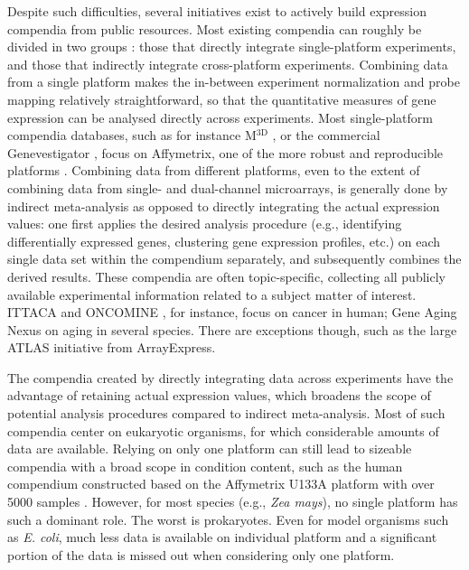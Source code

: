 Despite such difficulties, several initiatives exist to actively build 
expression compendia from public resources. 
Most existing compendia can roughly be divided in two groups \cite{Fierro2008}: 
those that directly integrate single-platform experiments, and those that 
indirectly integrate cross-platform experiments. 
Combining data from a single platform makes the in-between experiment 
normalization and probe mapping relatively straightforward, so that 
the quantitative measures of gene expression can be analysed directly across 
experiments. 
Most single-platform compendia databases, such as for instance 
M$^{\textrm{3D}}$ \cite{Faith2008}, or the commercial Genevestigator 
\cite{Hruz2008}, focus on Affymetrix, one of the more robust and reproducible 
platforms \cite{Bammler2005, Irizarry2005}. 
Combining data from different platforms, even to the extent of combining data 
from single- and dual-channel microarrays, is generally done by indirect 
meta-analysis as opposed to directly integrating the actual expression values: 
one first applies the desired analysis procedure (e.g., identifying 
differentially expressed genes, clustering gene expression profiles, etc.) on 
each single data set within the compendium separately, and subsequently 
combines the derived results. 
These compendia are often topic-specific, collecting all publicly available 
experimental information related to a subject matter of interest. 
ITTACA \cite{Elfilali2006} and ONCOMINE \cite{Rhodes2007}, for instance, focus 
on cancer in human; Gene Aging Nexus \cite{Pan2007} on aging in several 
species. 
There are exceptions though, such as the large ATLAS \cite{Kapushesky2010} 
initiative from ArrayExpress.


The compendia created by directly integrating data across experiments have the 
advantage of retaining actual expression values, which broadens the scope of 
potential analysis procedures compared to indirect meta-analysis.
Most of such compendia center on eukaryotic organisms, for which considerable 
amounts of data are available. 
Relying on only one platform can still lead to sizeable compendia with a broad 
scope in condition content, such as the human compendium constructed based on 
the Affymetrix U133A platform with over 5000 samples \cite{Lukk2010}. 
However, for most species (e.g., \textit{Zea mays}), no single platform has 
such a dominant role. 
%
The worst is prokaryotes. 
Even for model organisms such as {\it E. coli}, much less data is available on 
individual platform and a significant portion of the data is missed out when 
considering only one platform. 

